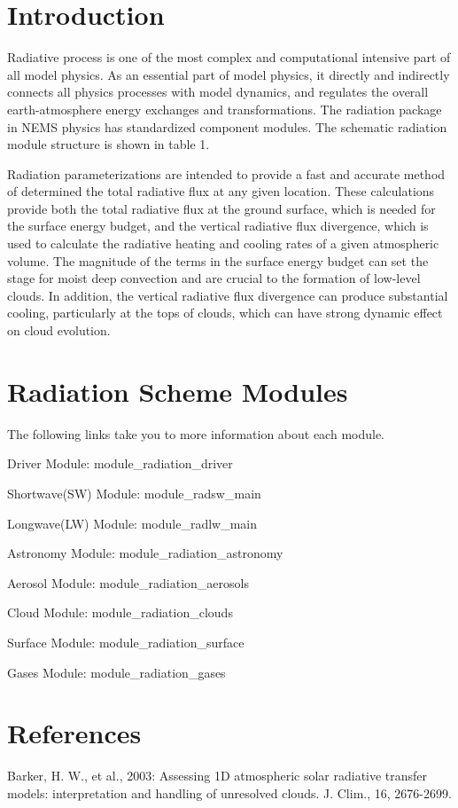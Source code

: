\hypertarget{index_Introduction}{}\section{Introduction}\label{index_Introduction}
Radiative process is one of the most complex and computational intensive part of all model physics. As an essential part of model physics, it directly and indirectly connects all physics processes with model dynamics, and regulates the overall earth-\/atmosphere energy exchanges and transformations. The radiation package in N\+E\+MS physics has standardized component modules. The schematic radiation module structure is shown in table 1.



Radiation parameterizations are intended to provide a fast and accurate method of determined the total radiative flux at any given location. These calculations provide both the total radiative flux at the ground surface, which is needed for the surface energy budget, and the vertical radiative flux divergence, which is used to calculate the radiative heating and cooling rates of a given atmospheric volume. The magnitude of the terms in the surface energy budget can set the stage for moist deep convection and are crucial to the formation of low-\/level clouds. In addition, the vertical radiative flux divergence can produce substantial cooling, particularly at the tops of clouds, which can have strong dynamic effect on cloud evolution.\hypertarget{index_mainpage-components}{}\section{Radiation Scheme Modules}\label{index_mainpage-components}
The following links take you to more information about each module.
\begin{DoxyItemize}
\item Driver Module\+: module\+\_\+radiation\+\_\+driver
\item Shortwave(\+S\+W) Module\+: module\+\_\+radsw\+\_\+main
\item Longwave(\+L\+W) Module\+: module\+\_\+radlw\+\_\+main
\item Astronomy Module\+: module\+\_\+radiation\+\_\+astronomy
\item Aerosol Module\+: module\+\_\+radiation\+\_\+aerosols
\item Cloud Module\+: module\+\_\+radiation\+\_\+clouds
\item Surface Module\+: module\+\_\+radiation\+\_\+surface
\item Gases Module\+: module\+\_\+radiation\+\_\+gases
\end{DoxyItemize}\hypertarget{index_References}{}\section{References}\label{index_References}
Barker, H. W., et al., 2003\+: Assessing 1D atmospheric solar radiative transfer models\+: interpretation and handling of unresolved clouds. J. Clim., 16, 2676-\/2699.

